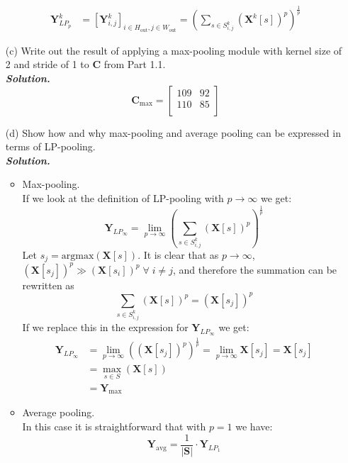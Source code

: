 \documentclass{article}
\newcommand{\matr}[1]{\bm{#1}}     %
\begin{document}
\begin{itemize}
\begin{align*}
        \matr{Y}_{LP_p}^k &= \left[\matr{Y}^k_{i,j}\right]_{i \in H_{\text{out}}, j \in W_{\text{out}}} = \left(\sum_{s \in S^{k}_{i,j}} \left( \matr{X}^k[s] \right)^p\right)^{\frac{1}{p}}
    \end{align*}
    \item[(c)] Write out the result of applying a max-pooling module with kernel size of 2 and stride of 1 to $\matr{C}$ from Part 1.1.\\
    \textbf{\textit{Solution.}} \\
    \begin{equation*}
        \matr{C}_{\max} = \begin{bmatrix}
                        109 & 92 \\
                        110 & 85 \\
                    \end{bmatrix}
    \end{equation*}
    \item[(d)] Show how and why max-pooling and average pooling can be expressed in terms of LP-pooling.\\
    \textbf{\textit{Solution.}}
    \begin{itemize}
        \item Max-pooling.\\
        If we look at the definition of LP-pooling with $p \rightarrow \infty$ we get:
        \begin{equation*}
            \matr{Y}_{LP_{\infty}} = \underset{p \rightarrow \infty}{\lim}\left(\sum_{s \in S^{k}_{i,j}} \left( \matr{X}[s] \right)^p \right)^{\frac{1}{p}}
        \end{equation*}
        Let $s_j = \text{argmax}(\matr{X}[s])$. It is clear that as $p \rightarrow \infty$, $\left( \matr{X}[s_j] \right)^p \gg \left( \matr{X}[s_i] \right)^p \; \forall \; i \neq j$, and therefore the summation can be rewritten as
        \begin{equation*}
            \sum_{s \in S^{k}_{i,j}} \left( \matr{X}[s] \right)^p = \left( \matr{X}[s_j] \right)^p
        \end{equation*}
        If we replace this in the expression for $\matr{Y}_{LP_{\infty}}$ we get:
        \begin{align*}
            \matr{Y}_{LP_{\infty}} &= \underset{p \rightarrow \infty}{\lim} \left(  \left( \matr{X}[s_j] \right)^p \right)^{\frac{1}{p}} = \underset{p \rightarrow \infty}{\lim} \matr{X}[s_j] = \matr{X}[s_j] \\
             &= \max_{s \in S}(\matr{X}[s]) \\
             &= \matr{Y}_{\max}
        \end{align*}
        \item Average pooling.\\
        In this case it is straightforward that with $p=1$ we have:
        \begin{equation*}
            \matr{Y}_{\text{avg}} = \frac{1}{|\matr{S}|} \cdot \matr{Y}_{LP_1}
        \end{equation*}
    \end{itemize}
\end{itemize}
\end{document}
